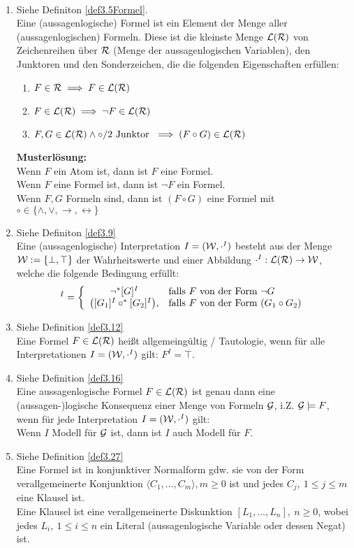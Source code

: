 \begin{lösung}\
\begin{enumerate}
\item Siehe Definiton \ref{def3.5Formel}.\\
Eine (aussagenlogische) Formel ist ein Element der Menge aller (aussagenlogischen) Formeln. Diese ist die kleinste Menge $\mathcal{L}(\mathcal{R})$ von Zeichenreihen über $\mathcal{R}$ (Menge der aussagenlogischen Variablen), den Junktoren und den Sonderzeichen, die die folgenden Eigenschaften erfüllen:
\begin{enumerate}
\item $F\in\mathcal{R}\implies F\in\mathcal{L}(\mathcal{R})$
\item $F\in\mathcal{L}(\mathcal{R})\implies\neg F\in\mathcal{L}(\mathcal{R})$
\item $F,G\in\mathcal{L}(\mathcal{R})\wedge\circ/2\text{ Junktor }\implies(F\circ G)\in\mathcal{L}(\mathcal{R})$
\end{enumerate}
\textbf{Musterlösung:}\\
Wenn $F$ ein Atom ist, dann ist $F$ eine Formel.\\
Wenn $F$ eine Formel ist, dann ist $\neg F$ ein Formel.\\
Wenn $F,G$ Formeln sind, dann ist $(F\circ G)$ eine Formel mit $\circ\in\lbrace\wedge, \vee,\to,\longleftrightarrow\rbrace$
\item Siehe Definiton \ref{def3.9}\\
Eine (aussagenlogische) Interpretation $I=(\mathcal{W},\cdot^I)$ besteht aus der Menge $\mathcal{W}:=\lbrace\bot,\top\rbrace$ der Wahrheitswerte und einer Abbildung $\cdot^I:\mathcal{L}(\mathcal{R})\to\mathcal{W}$, welche die folgende Bedingung erfüllt:
\begin{align*}
[F]^I=\left\lbrace\begin{array}{cl}
\neg^\ast[G]^I & \falls F \text{ von der Form }\neg G\\
\big([G_1]^I\circ^\ast[G_2]^I\big), &\falls F\text{ von der Form }(G_1\circ G_2)
\end{array}\right.
\end{align*}
\item Siehe Definition \ref{def3.12}\\
Eine Formel $F\in\mathcal{L}(\mathcal{R})$ heißt allgemeingültig / Tautologie, wenn für alle Interpretationen $I=(\mathcal{W},\cdot^I)$ gilt: $F^I=\top$.
\item Siehe Definition \ref{def3.16}\\
Eine aussagenlogische Formel $F\in\mathcal{L}(\mathcal{R})$ ist genau dann eine (aussagen-)logische Konsequenz einer Menge von Formeln $\mathcal{G}$, i.Z. $\mathcal{G}\models F$, wenn für jede Interpretation $I=(\mathcal{W},\cdot^I)$ gilt:\\
Wenn $I$ Modell für $\mathcal{G}$ ist, dann ist $I$ auch Modell für $F$.
\item Siehe Definition \ref{def3.27}\\
Eine Formel ist in konjunktiver Normalform gdw. sie von der Form verallgemeinerte Konjunktion $\langle C_1,\ldots,C_m\rangle,m\geq0$ ist und jedes $C_j,~1\leq j\leq m$ eine Klausel ist.\\
Eine Klausel ist eine verallgemeinerte Diskunktion  $[L_1,\ldots,L_n],~n\geq0$, wobei jedes $L_i,~1\leq i\leq n$ ein Literal (aussagenlogische Variable oder dessen Negat) ist.
\end{enumerate}
\end{lösung}


